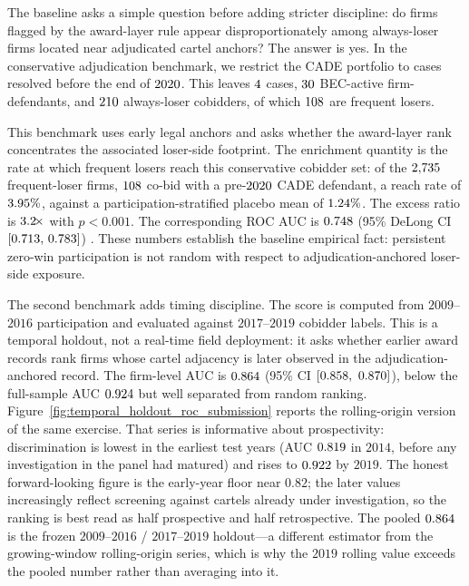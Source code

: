 The baseline asks a simple question before adding stricter
discipline: do firms flagged by the award-layer rule appear
disproportionately among always-loser firms located near
adjudicated cartel anchors? The answer is yes. In the
conservative adjudication benchmark, we restrict the CADE
portfolio to cases resolved before the end of
$2020$. This leaves $4$
cases, $30$ BEC-active firm-defendants, and
$210$ always-loser cobidders, of which
$108$ are frequent losers.

This benchmark uses early legal anchors and asks whether the
award-layer rank concentrates the associated loser-side
footprint. The enrichment quantity is the rate at which frequent
losers reach this conservative cobidder set: of the $2{,}735$
frequent-loser firms, $108$ co-bid with a
pre-$2020$ CADE defendant, a reach rate of
$3.95\%$, against a participation-stratified placebo mean
of $1.24\%$. The excess ratio is
$3.2\!\times$ with $p<0.001$. The corresponding ROC
AUC is $0.748$ (95\% DeLong CI $[0.713,\,0.783]$)
\citep{delong1988comparing}.
These numbers establish the baseline empirical fact: persistent
zero-win participation is not random with respect to
adjudication-anchored loser-side exposure.

The second benchmark adds timing discipline. The score is
computed from $2009$--$2016$ participation and evaluated against
$2017$--$2019$ cobidder labels. This is a temporal holdout, not a
real-time field deployment: it asks whether earlier award records
rank firms whose cartel adjacency is later observed in the
adjudication-anchored record. The firm-level AUC is
$0.864$ (95\% CI $[0.858,\ 0.870]$), below the
full-sample AUC $0.924$ but well separated from random
ranking. Figure~\ref{fig:temporal_holdout_roc_submission} reports the
rolling-origin version of the same exercise.
That series is informative about prospectivity: discrimination is
lowest in the earliest test years (AUC $0.819$ in
$2014$, before any investigation in the panel had matured) and
rises to $0.922$ by $2019$. The honest
forward-looking figure is the early-year floor near $0.82$; the
later values increasingly reflect screening against cartels
already under investigation, so the ranking is best read as half
prospective and half retrospective. The pooled
$0.864$ is the frozen $2009$--$2016$ / $2017$--$2019$
holdout---a different estimator from the growing-window
rolling-origin series, which is why the $2019$ rolling value
exceeds the pooled number rather than averaging into it.

